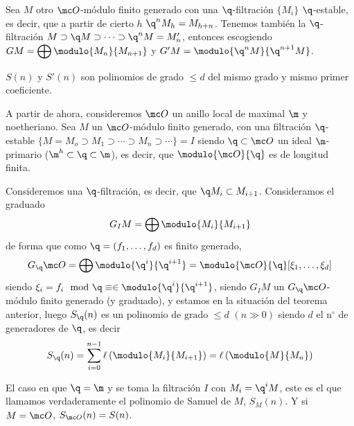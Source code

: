 Sea $M$ otro $\mc O$-m\'odulo finito generado con una $\q$-filtraci\'on $\{M_i\}$ $\q$-estable, es decir, que a partir de cierto $h$ $\q^n M_h = M_{h+n}$. Tenemos tambi\'en la $\q$-filtraci\'on $M\supset \q M \supset \cdots \supset \q^nM = M_n'$, entonces escogiendo $GM =\displaystyle \bigoplus \modulo{M_n}{M_{n+1}}$ y $G'M =  \modulo{\q^n M}{\q^{n+1} M}$. 
\begin{teo}
    $S(n)$ y $S'(n)$ son polinomios de grado $\le d$ del mismo grado y mismo primer coeficiente. 
\end{teo} 

A partir de ahora, consideremos $\mc O$ un anillo local de maximal $\m$ y noetheriano. Sea $M$ un $\mc O$-m\'odulo finito generado, con una filtraci\'on $\q$-estable $\{M=M_o \supset M_1 \supset \cdots \supset M_n \supset \cdots\} = I$ siendo $\q\subset \mc O$ un ideal $\m$-primario ($\m^h \subset \q \subset \m$), es decir, que $\modulo{\mc O}{\q}$ es de longitud finita. 

Consideremos una $\q$-filtraci\'on, es decir, que $\q M_i \subset M_{i+1}$. Consideramos el graduado
$$G_IM = \bigoplus \modulo{M_i}{M_{i+1}}$$
de forma que como $\q = (f_1, \dots, f_d)$ es finito generado, 
$$G_{\q}\mc O = \bigoplus \modulo{\q^i}{\q^{i+1}} = \modulo{\mc O}{\q}[\xi_1, \ldots, \xi_d]$$
siendo $\xi_i=f_i \mod \q \equiv \in \modulo{\q^i}{\q^{i+1}}$, siendo $G_IM$ un $G_{\q}\mc O$-m\'odulo finito generado (y graduado), y estamos en la situaci\'on del teorema anterior, luego
$S_{\q}(n)$ es un $\text{polinomio de grado } \le d \, \, (n \gg  0)$ siendo $d$ el n$^{\circ}$ de generadores de $\q$, es decir
$$S_{\q}(n) = \sum_{i=0}^{n-1} \ell\left( \modulo{M_i}{M_{i+1}}\right) = \ell\left( \modulo{M}{M_n}\right)$$

El caso en que $\q = \m$ y se toma la filtraci\'on $I$ con $M_i = \q^i M$, este es el que llamamos verdaderamente el polinomio de Samuel de $M$, $S_M(n)$. Y si $M=\mc O$, $S_{\mc O}(n) = S(n)$.


